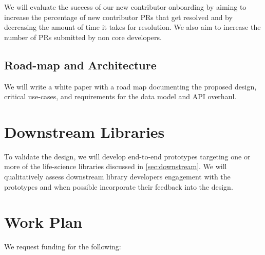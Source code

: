 \documentclass[11pt,letterpaper]{article}  %
\begin{document}
We will evaluate the success of our new contributor onboarding by aiming to increase the percentage of new contributor PRs that get resolved and by decreasing the amount of time it takes for resolution. We also aim to increase the number of PRs submitted by non core developers. 


\subsection{Road-map and Architecture}

We will write a white paper with a road map documenting the proposed design, critical use-cases, and requirements for the data model and API overhaul.


\section{Downstream Libraries}
To validate the design, we will develop end-to-end prototypes targeting one or more of the life-science libraries discussed in \ref{sec:downstream}. We will qualitatively assess downstream library developers engagement with the prototypes and when possible incorporate their feedback into the design. 

\section{Work Plan}

We request funding for the following:
\end{document}
